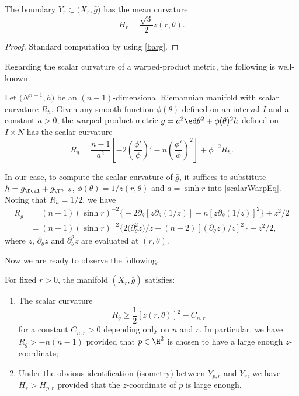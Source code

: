 \begin{Lemma}%
The boundary $\bar Y_r\subset \bigl(\bar X_r, \bar g\bigr)$ has the mean curvature
\begin{equation}\label{barHr}
\bar H_r=\frac{\sqrt{3}}{2}z(r,\theta).
\end{equation}
\end{Lemma}
\begin{proof}
Standard computation by using \eqref{barg}.
\end{proof}


Regarding the scalar curvature of a warped-product metric,
the following is well-known.

\begin{Lemma}[{cf.~\cite[Proposition 7.33]{GL1983}}]\label{scalarwarp}
Let $\bigl(N^{n-1}, h\bigr)$ be an $(n-1)$-dimensional Riemannian manifold with scalar curvature $R_h$. Given any smooth function $\phi(\theta)$ defined on an
interval $I$ and a constant $a>0$, the warped product metric
$
	g = a^2\ed\theta^2+ \phi(\theta)^2 h
$
defined on $I\times N$ has the scalar curvature
\begin{equation}\label{scalarWarpEq}
R_g=\frac{n-1}{a^2}\left[-2\left(\frac{\phi'}{\phi}\right)'-n\left(\frac{\phi'}{\phi}\right)^2\right]+ \phi^{-2}R_{h}.
\end{equation}
\end{Lemma}

In our case, to compute the scalar curvature of $\bar g$, it suffices to substitute
$h = g_\Dcal + g_{\T^{n-3}}$, $\phi(\theta) = 1/z(r,\theta)$ and $a = \sinh r$ into \eqref{scalarWarpEq}. Noting that
$R_h = 1/2$, we have
\begin{align}
	R_{\bar g}&=(n-1)(\sinh r)^{-2}\bigl\{-2\partial_\theta[z\partial_\theta(1/z)]-n[z\partial_\theta(1/z)]^2\bigr\} + z^{2}/2\nonumber\\
	&=(n-1)(\sinh r)^{-2}\bigl\{2\bigl(\partial_\theta^2 z\bigr)/z-(n+2)[(\partial_\theta z)/z]^2\bigr\}	+ z^{2}/2,\label{Rgbar}
		\end{align}		
where $z$, $\partial_\theta z$ and $\partial_\theta^2 z$ are evaluated at $(r,\theta)$.

Now we are ready to observe the following.

\begin{Prop}\label{XrbarInfo}
For fixed $r>0$, the manifold $(\bar X_r, \bar g)$ satisfies:
\begin{enumerate}\itemsep=0pt
\item[$(a)$]  The scalar curvature
\[
	R_{\bar g}\geq \frac{1}{2}[z(r,\theta)]^2-C_{n,r}
\] for a
constant $C_{n,r}>0$ depending only on $n$ and $r$. In particular, we have
$
R_{\bar g}>-n(n-1)
$
provided that $p\in \H^2$ is chosen to have a large enough $z$-coordinate;

\item[$(b)$] Under the obvious identification $($isometry$)$ between $Y_{p,r}$ and $\bar Y_r$, we have
 $\bar H_r >H_{p,r}$ provided that the $z$-coordinate of $p$ is large enough.
 \end{enumerate}
\end{Prop}

